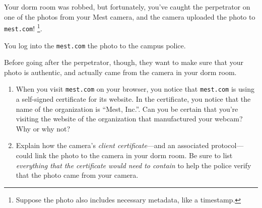 \newpage
{} Your dorm room was robbed, but fortunately, you've caught the
perpetrator on one of the photos from your Mest camera, and the camera
uploaded the photo to {\tt mest.com}! \footnote{Suppose the
photo also includes necessary metadata, like a timestamp.}.

You log into the {\tt mest.com} the photo to the campus police.  

Before going after the perpetrator, though, they want to make sure that your
photo is authentic, and actually came from the camera in your dorm
room. 

\begin{enumerate}
\item When you visit {\tt mest.com} on your browser, you notice that
  {\tt mest.com} is using a self-signed 
  certificate for its website. In the certificate, you notice that the
  name of the organization is ``Mest, Inc.''. Can you be certain that
  you're visiting the website of the organization that manufactured
  your webcam?  Why or why not?


\item Explain how the camera's {\em client certificate}---and
  an associated protocol---could link the photo to the camera in your
  dorm room. Be sure to list {\em everything that the certificate would
    need to contain} to help the police verify that the photo came from
  your camera.


\end{enumerate}
\eprob

